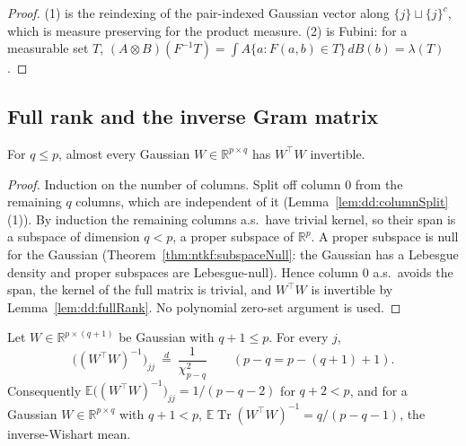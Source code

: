 \begin{proof}
  \leanok
(1) is the reindexing of the pair-indexed Gaussian vector along $\{j\}\sqcup\{j\}^c$, which is measure preserving for the product measure. (2) is Fubini: for a measurable set $T$,
$(A\otimes B)(F^{-1}T)=\int A\{a:F(a,b)\in T\}\,dB(b)=\lambda(T)$.
\end{proof}

\subsection{Full rank and the inverse Gram matrix}

\begin{theorem}\label{thm:dd:fullRankAS}
  \leanok
For $q\le p$, almost every Gaussian $W\in\mathbb R^{p\times q}$ has $W^\top W$ invertible.
\end{theorem}

\begin{proof}
  \leanok
Induction on the number of columns. Split off column $0$ from the remaining $q$ columns, which are independent of it (Lemma~\ref{lem:dd:columnSplit}(1)). By induction the remaining columns a.s.\ have trivial kernel, so their
span is a subspace of dimension $q<p$, a proper subspace of $\mathbb R^p$. A proper subspace is null for the Gaussian (Theorem~\ref{thm:ntkf:subspaceNull}: the Gaussian has a Lebesgue density and proper subspaces are Lebesgue-null). Hence
column $0$ a.s.\ avoids the span, the kernel of the full matrix is trivial, and $W^\top W$ is invertible by Lemma~\ref{lem:dd:fullRank}. No polynomial zero-set argument is used.
\end{proof}

\begin{theorem}\label{thm:dd:invGramDiag}
  \leanok
Let $W\in\mathbb R^{p\times(q+1)}$ be Gaussian with $q+1\le p$. For every $j$,
\[
  \bigl((W^\top W)^{-1}\bigr)_{jj}\ \overset d=\ \frac1{\chi^2_{p-q}}\qquad(p-q=p-(q+1)+1).
\]
Consequently $\mathbb E\bigl((W^\top W)^{-1}\bigr)_{jj}=1/(p-q-2)$ for $q+2<p$, and for a Gaussian $W\in\mathbb R^{p\times q}$ with $q+1<p$,
$\mathbb E\operatorname{Tr}(W^\top W)^{-1}=q/(p-q-1)$, the inverse-Wishart mean.
\end{theorem}

